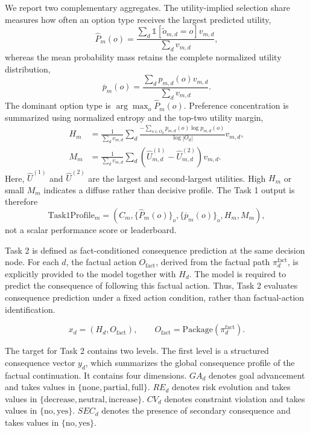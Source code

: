 \documentclass[pdflatex,sn-mathphys-num]{sn-jnl}%
\theoremstyle{thmstyleone}%
\theoremstyle{thmstyletwo}%
\theoremstyle{thmstylethree}%
\begin{document}
We report two complementary aggregates. The utility-implied selection share measures how often an option type receives the largest predicted utility,
\begin{equation}
\widehat P_m(o)=\frac{\sum_d\mathbb{1}[\widetilde o_{m,d}=o]v_{m,d}}{\sum_d v_{m,d}},
\end{equation}
whereas the mean probability mass retains the complete normalized utility distribution,
\begin{equation}
\overline p_m(o)=\frac{\sum_d p_{m,d}(o)v_{m,d}}{\sum_d v_{m,d}}.
\end{equation}
The dominant option type is $\arg\max_o\widehat P_m(o)$. Preference concentration is summarized using normalized entropy and the top-two utility margin,
\begin{align}
H_m&=\frac{1}{\sum_d v_{m,d}}\sum_d
\frac{-\sum_{o\in O_d}p_{m,d}(o)\log p_{m,d}(o)}{\log |O_d|}v_{m,d},\\
M_m&=\frac{1}{\sum_d v_{m,d}}\sum_d
\left(\widehat U_{m,d}^{(1)}-\widehat U_{m,d}^{(2)}\right)v_{m,d}.
\end{align}
Here, $\widehat U^{(1)}$ and $\widehat U^{(2)}$ are the largest and second-largest utilities. High $H_m$ or small $M_m$ indicates a diffuse rather than decisive profile. The Task 1 output is therefore
\begin{equation}
\mathrm{Task1Profile}_m=
\left(C_m,\{\widehat P_m(o)\}_o,\{\overline p_m(o)\}_o,H_m,M_m\right),
\end{equation}
not a scalar performance score or leaderboard.

Task 2 is defined as fact-conditioned consequence prediction at the same decision node. For each $d$, the factual action $O_{\mathrm{fact}}$, derived from the factual path $\pi_d^{\mathrm{fact}}$, is explicitly provided to the model together with $H_d$. The model is required to predict the consequence of following this factual action. Thus, Task 2 evaluates consequence prediction under a fixed action condition, rather than factual-action identification.

\begin{equation}
x_d=(H_d,O_{\mathrm{fact}}),\qquad O_{\mathrm{fact}}=\mathrm{Package}(\pi_d^{\mathrm{fact}}).
\end{equation}

The target for Task 2 contains two levels. The first level is a structured consequence vector $y_d$, which summarizes the global consequence profile of the factual continuation. It contains four dimensions. $GA_d$ denotes goal advancement and takes values in $\{\mathrm{none},\mathrm{partial},\mathrm{full}\}$. $RE_d$ denotes risk evolution and takes values in $\{\mathrm{decrease},\mathrm{neutral},\mathrm{increase}\}$. $CV_d$ denotes constraint violation and takes values in $\{\mathrm{no},\mathrm{yes}\}$. $SEC_d$ denotes the presence of secondary consequence and takes values in $\{\mathrm{no},\mathrm{yes}\}$.
\end{document}

